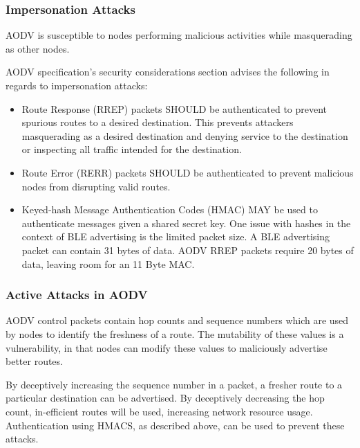       \subsubsection{Impersonation Attacks}
    AODV is susceptible to nodes performing malicious activities while masquerading
    as other nodes.

    AODV specification’s \cite{RFC3561} security considerations section advises the
    following in regards to impersonation attacks:
    \begin{itemize}
      \item Route Response (RREP) packets SHOULD be authenticated to prevent spurious
      routes to a desired destination. This prevents attackers masquerading as a
      desired destination and denying service to the destination or inspecting all
      traffic intended for the destination.
      \item Route Error (RERR) packets SHOULD be authenticated to prevent malicious
      nodes from disrupting valid routes.
      \item Keyed-hash Message Authentication Codes (HMAC) MAY be used to authenticate
      messages given a shared secret key. One issue with hashes in the context of
      BLE advertising is the limited packet size. A BLE advertising packet can
      contain 31 bytes of data. AODV RREP packets require 20 bytes of data, leaving
      room for an 11 Byte MAC.
    \end{itemize}

      \subsubsection{Active Attacks in AODV}
    AODV control packets contain hop counts and sequence numbers which are used
    by nodes to identify the freshness of a route. The mutability of these values
    is a vulnerability, in that nodes can modify these values to maliciously
    advertise better routes.

    By deceptively increasing the sequence number in a packet, a fresher route
    to a particular destination can be advertised. By deceptively decreasing the
    hop count, in-efficient routes will be used, increasing network resource usage.
    Authentication using HMACS, as described above, can be used to prevent
    these attacks.
